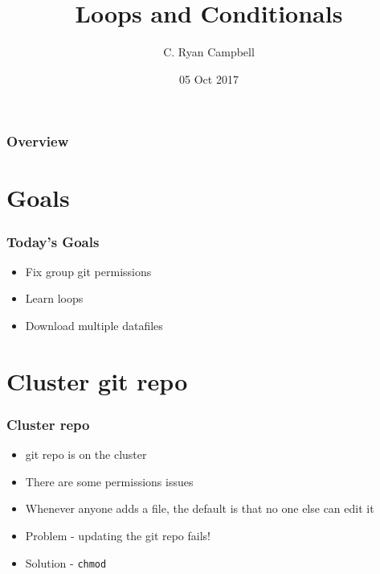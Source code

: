 \documentclass[14pt,handout]{beamer}
\title[Loops]{Loops and Conditionals} %
\author{C. Ryan Campbell} %
\institute[Duke] %
{
Duke University \\ %
\medskip
\textit{c.ryan.campbell@duke.edu} %
}
\date{05 Oct 2017} %
\begin{document}
\begin{frame}
\titlepage %
\end{frame}

\begin{frame}
\frametitle{Overview} %
\tableofcontents %
\end{frame}


\section{Goals} %

\begin{frame}
\frametitle{Today's Goals}
\begin{itemize}
	\item<+-> Fix group git permissions
	\item<+-> Learn loops
	\item<+-> Download multiple datafiles
\end{itemize}
\end{frame}

\section{Cluster git repo}

\begin{frame}
\frametitle{Cluster repo}
\begin{itemize}
	\item<+-> git repo is on the cluster
	\item<+-> There are some permissions issues
	\item<+-> Whenever anyone adds a file, the default is that no one else can edit it
	\item<+-> Problem - updating the git repo fails!
	\item<+-> Solution - \texttt{chmod}
\end{itemize}
\end{frame}
\end{document}
